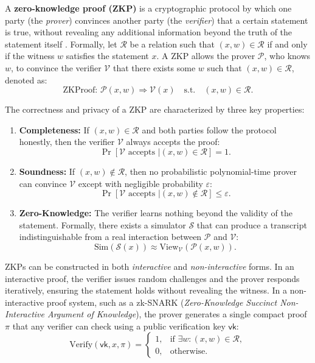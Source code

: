 \documentclass[12pt,a4paper]{article}
\begin{document}
A \textbf{zero-knowledge proof (ZKP)} is a cryptographic protocol by which one party (the \textit{prover}) convinces another party (the \textit{verifier}) that a certain statement is true, without revealing any additional information beyond the truth of the statement itself \parencite{hasan2019overview}.  
Formally, let $\mathcal{R}$ be a relation such that $(x, w) \in \mathcal{R}$ if and only if the witness $w$ satisfies the statement $x$.  
A ZKP allows the prover $\mathcal{P}$, who knows $w$, to convince the verifier $\mathcal{V}$ that there exists some $w$ such that $(x, w) \in \mathcal{R}$, denoted as:
$$
\text{ZKProof: } \mathcal{P}(x, w) \Rightarrow \mathcal{V}(x) \quad \text{s.t.} \quad (x, w) \in \mathcal{R}.
$$

The correctness and privacy of a ZKP are characterized by three key properties:

\begin{enumerate}
    \item \textbf{Completeness:} If $(x, w) \in \mathcal{R}$ and both parties follow the protocol honestly, then the verifier $\mathcal{V}$ always accepts the proof:
    $$
    \Pr[\mathcal{V} \text{ accepts } | (x, w) \in \mathcal{R}] = 1.
    $$
    
    \item \textbf{Soundness:} If $(x, w) \notin \mathcal{R}$, then no probabilistic polynomial-time prover can convince $\mathcal{V}$ except with negligible probability $\varepsilon$:
    $$
    \Pr[\mathcal{V} \text{ accepts } | (x, w) \notin \mathcal{R}] \leq \varepsilon.
    $$
    
    \item \textbf{Zero-Knowledge:} The verifier learns nothing beyond the validity of the statement.  
    Formally, there exists a simulator $\mathcal{S}$ that can produce a transcript indistinguishable from a real interaction between $\mathcal{P}$ and $\mathcal{V}$:
    $$
    \text{Sim}(\mathcal{S}(x)) \approx \text{View}_{\mathcal{V}}(\mathcal{P}(x, w)).
    $$
\end{enumerate}

ZKPs can be constructed in both \textit{interactive} and \textit{non-interactive} forms.  
In an interactive proof, the verifier issues random challenges and the prover responds iteratively, ensuring the statement holds without revealing the witness.  
In a non-interactive proof system, such as a zk-SNARK (\textit{Zero-Knowledge Succinct Non-Interactive Argument of Knowledge}), the prover generates a single compact proof $\pi$ that any verifier can check using a public verification key $\mathsf{vk}$:
$$
\text{Verify}(\mathsf{vk}, x, \pi) = 
\begin{cases}
1, & \text{if } \exists w : (x, w) \in \mathcal{R},\\
0, & \text{otherwise.}
\end{cases}
$$
\end{document}
